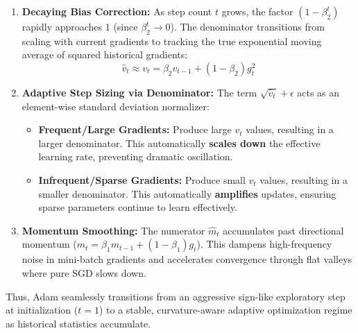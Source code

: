 \documentclass[11pt]{article}
\begin{document}
\begin{enumerate}
    \item \textbf{Decaying Bias Correction:} 
    As step count $t$ grows, the factor $(1-\beta_2^t)$ rapidly approaches $1$ (since $\beta_2^{t} \to 0$). The denominator transitions from scaling with current gradients to tracking the true exponential moving average of squared historical gradients:
    \[
    \hat{v}_t \approx v_t = \beta_2 v_{t-1} + (1-\beta_2)g_t^2
    \]
    
    \item \textbf{Adaptive Step Sizing via Denominator:} 
    The term $\sqrt{\hat{v}_t} + \epsilon$ acts as an element-wise standard deviation normalizer:
    \begin{itemize}
        \item \textbf{Frequent/Large Gradients:} Produce large $v_t$ values, resulting in a larger denominator. This automatically \textbf{scales down} the effective learning rate, preventing dramatic oscillation.
        \item \textbf{Infrequent/Sparse Gradients:} Produce small $v_t$ values, resulting in a smaller denominator. This automatically \textbf{amplifies} updates, ensuring sparse parameters continue to learn effectively.
    \end{itemize}
    
    \item \textbf{Momentum Smoothing:} 
    The numerator $\hat{m}_t$ accumulates past directional momentum ($m_t = \beta_1 m_{t-1} + (1-\beta_1)g_t$). This dampens high-frequency noise in mini-batch gradients and accelerates convergence through flat valleys where pure SGD slows down.
\end{enumerate}

Thus, Adam seamlessly transitions from an aggressive sign-like exploratory step at initialization ($t=1$) to a stable, curvature-aware adaptive optimization regime as historical statistics accumulate.
\end{document}
